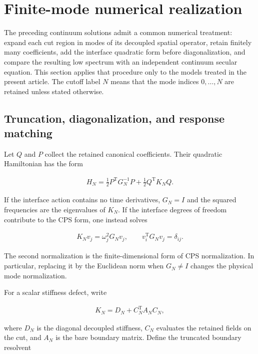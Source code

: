 \section{Finite-mode numerical realization}\label{sec:numerics}

The preceding continuum solutions admit a common numerical treatment: expand each cut region in modes of its decoupled spatial operator, retain finitely many coefficients, add the interface quadratic form before diagonalization, and compare the resulting low spectrum with an independent continuum secular equation. This section applies that procedure only to the models treated in the present article. The cutoff label $N$ means that the mode indices $0,\ldots,N$ are retained unless stated otherwise.

\subsection{Truncation, diagonalization, and response matching}\label{subsec:numerics-method}

Let $Q$ and $P$ collect the retained canonical coefficients. Their quadratic Hamiltonian has the form

\begin{align}
H_N
=\frac12P^{\mathrm T}G_N^{-1}P
+\frac12Q^{\mathrm T}K_NQ.
\end{align}

If the interface action contains no time derivatives, $G_N=I$ and the squared frequencies are the eigenvalues of $K_N$. If the interface degrees of freedom contribute to the CPS form, one instead solves

\begin{align}
K_Nv_j=\omega_j^2G_Nv_j,
\qquad
v_i^{\mathrm T}G_Nv_j=\delta_{ij}.
\end{align}

The second normalization is the finite-dimensional form of CPS normalization. In particular, replacing it by the Euclidean norm when $G_N\neq I$ changes the physical mode normalization.

For a scalar stiffness defect, write

\begin{align}
K_N=D_N+C_N^{\mathrm T}A_NC_N,
\end{align}

where $D_N$ is the diagonal decoupled stiffness, $C_N$ evaluates the retained fields on the cut, and $A_N$ is the bare boundary matrix. Define the truncated boundary resolvent

